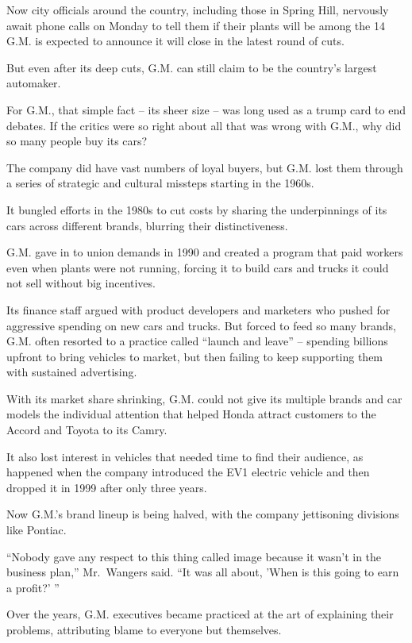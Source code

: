 \documentclass[12pt,a4paper,onecolumn]{article}
\begin{document}
Now city officials around the country, including those in Spring Hill, nervously await phone calls
on Monday to tell them if their plants will be among the 14 G.M. is expected to announce it will
close in the latest round of cuts.

But even after its deep cuts, G.M. can still claim to be the country's largest automaker.

For G.M., that simple fact -- its sheer size -- was long used as a trump card to end debates. If the
critics were so right about all that was wrong with G.M., why did so many people buy its cars?

The company did have vast numbers of loyal buyers, but G.M. lost them through a series of strategic
and cultural missteps starting in the 1960s.

It bungled efforts in the 1980s to cut costs by sharing the underpinnings of its cars across
different brands, blurring their distinctiveness.

G.M. gave in to union demands in 1990 and created a program that paid workers even when plants were
not running, forcing it to build cars and trucks it could not sell without big incentives.

Its finance staff argued with product developers and marketers who pushed for aggressive spending on
new cars and trucks. But forced to feed so many brands, G.M. often resorted to a practice called
``launch and leave'' -- spending billions upfront to bring vehicles to market, but then failing to
keep supporting them with sustained advertising.

With its market share shrinking, G.M. could not give its multiple brands and car models the
individual attention that helped Honda attract customers to the Accord and Toyota to its Camry.

It also lost interest in vehicles that needed time to find their audience, as happened when the
company introduced the EV1 electric vehicle and then dropped it in 1999 after only three years.

Now G.M.'s brand lineup is being halved, with the company jettisoning divisions like Pontiac.

``Nobody gave any respect to this thing called image because it wasn't in the business plan,''
Mr.~Wangers said. ``It was all about, 'When is this going to earn a profit?' ''

Over the years, G.M. executives became practiced at the art of explaining their problems,
attributing blame to everyone but themselves.
\end{document}
